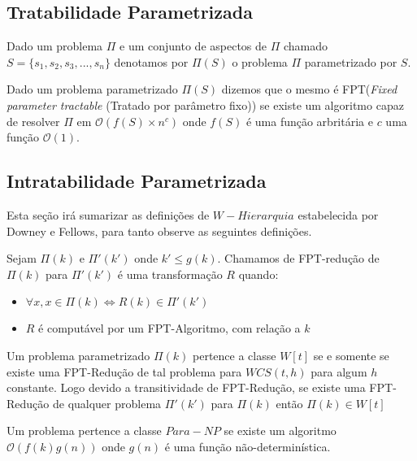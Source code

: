 \subsection{Tratabilidade Parametrizada}
\begin{definition}
Dado um problema $\Pi$ e um conjunto de aspectos de $\Pi$ chamado $S = \{s_1,s_2,s_3,...,s_n\}$ denotamos por $\Pi(S)$ o problema $\Pi$ parametrizado por $S$.
\end{definition}
\begin{definition}
Dado um problema parametrizado $\Pi(S)$ dizemos que o mesmo é FPT(\emph{Fixed parameter tractable} (Tratado por parâmetro fixo)) se existe um algoritmo capaz de resolver $\Pi$ em $\mathcal{O}(f(S)\times n^c)$ onde $f(S)$ é uma função arbritária e $c$ uma função $\mathcal{O}(1)$.
\end{definition}

\subsection{Intratabilidade Parametrizada}
Esta seção irá sumarizar as definições de $W-Hierarquia$ estabelecida por Downey e Fellows, para tanto observe as seguintes definições.
\begin{definition}
 Sejam $\Pi(k)$ e $\Pi'(k')$ onde $k' \leq g(k)$. Chamamos de FPT-redução de $\Pi(k)$ para $\Pi'(k')$ é uma transformação $R$ quando:
 \begin{itemize}
   \item $\forall x, x \in \Pi(k) \iff R(k) \in \Pi'(k')$
   \item $R$ é computável por um FPT-Algoritmo, com relação a $k$
 \end{itemize}
\end{definition}

\begin{definition}
 Um problema parametrizado $\Pi(k)$ pertence a classe $W[t]$ se e somente se existe uma FPT-Redução de tal problema para $WCS(t,h)$ para algum $h$ constante. Logo devido a transitividade de FPT-Redução, se existe uma FPT-Redução de qualquer problema $\Pi'(k')$ para $\Pi(k)$ então $\Pi(k) \in W[t]$
\end{definition}

\begin{definition}
 Um problema pertence a classe $Para-NP$ se existe um algoritmo $\mathcal{O}(f(k)g(n))$ onde $g(n)$ é uma função não-determinística.
\end{definition}

\begin{lema}

\end{lema}
